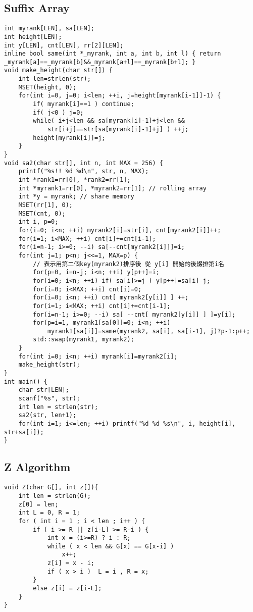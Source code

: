 \documentclass[11pt,twocolumn,a4paper]{article}
\begin{document}
\subsection{Suffix Array}
\begin{lstlisting}[label=Suffix Array]
int myrank[LEN], sa[LEN];
int height[LEN];
int y[LEN], cnt[LEN], rr[2][LEN];
inline bool same(int *_myrank, int a, int b, int l) { return _myrank[a]==_myrank[b]&&_myrank[a+l]==_myrank[b+l]; }
void make_height(char str[]) {
	int len=strlen(str);
	MSET(height, 0);
	for(int i=0, j=0; i<len; ++i, j=height[myrank[i-1]]-1) {
		if( myrank[i]==1 ) continue;
		if( j<0 ) j=0;
		while( i+j<len && sa[myrank[i]-1]+j<len &&
			str[i+j]==str[sa[myrank[i]-1]+j] ) ++j;
		height[myrank[i]]=j;
	}
}
void sa2(char str[], int n, int MAX = 256) {
	printf("%s!! %d %d\n", str, n, MAX);
	int *rank1=rr[0], *rank2=rr[1];
	int *myrank1=rr[0], *myrank2=rr[1]; // rolling array
	int *y = myrank; // share memory
	MSET(rr[1], 0);
	MSET(cnt, 0);
	int i, p=0;
	for(i=0; i<n; ++i) myrank2[i]=str[i], cnt[myrank2[i]]++;
	for(i=1; i<MAX; ++i) cnt[i]+=cnt[i-1];
	for(i=n-1; i>=0; --i) sa[--cnt[myrank2[i]]]=i;
	for(int j=1; p<n; j<<=1, MAX=p) {
		// 表示用第二個key(myrank2)排序後 從 y[i] 開始的後綴排第i名
		for(p=0, i=n-j; i<n; ++i) y[p++]=i;
		for(i=0; i<n; ++i) if( sa[i]>=j ) y[p++]=sa[i]-j;
		for(i=0; i<MAX; ++i) cnt[i]=0;
		for(i=0; i<n; ++i) cnt[ myrank2[y[i]] ] ++;
		for(i=1; i<MAX; ++i) cnt[i]+=cnt[i-1];
		for(i=n-1; i>=0; --i) sa[ --cnt[ myrank2[y[i]] ] ]=y[i];
		for(p=i=1, myrank1[sa[0]]=0; i<n; ++i)
			myrank1[sa[i]]=same(myrank2, sa[i], sa[i-1], j)?p-1:p++;
		std::swap(myrank1, myrank2);
	}
	for(int i=0; i<n; ++i) myrank[i]=myrank2[i];
	make_height(str);
}
int main() {
	char str[LEN];
	scanf("%s", str);
	int len = strlen(str);
	sa2(str, len+1);
	for(int i=1; i<=len; ++i) printf("%d %d %s\n", i, height[i], str+sa[i]);
}
\end{lstlisting}

\subsection{Z Algorithm}
\begin{lstlisting}[label=Z Algorithm]
void Z(char G[], int z[]){
	int len = strlen(G);
	z[0] = len;
	int L = 0, R = 1;
	for ( int i = 1 ; i < len ; i++ ) {
		if ( i >= R || z[i-L] >= R-i ) {
			int x = (i>=R) ? i : R;
			while ( x < len && G[x] == G[x-i] )  
				x++;
			z[i] = x - i;
			if ( x > i )  L = i , R = x;	
		}		
		else z[i] = z[i-L];
	}
}
\end{lstlisting}
\end{document}
